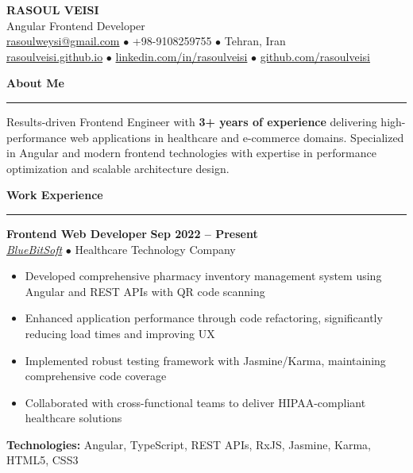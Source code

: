 \documentclass[a4paper,10pt]{article}
\newcommand{\sectionheader}[1]{\vspace{6pt}\textbf{\large\color{headercolor}#1}\vspace{1pt}\hrule\vspace{4pt}}
\newcommand{\jobtitle}[1]{\textbf{#1}}
\newcommand{\company}[1]{\textit{\color{headercolor}#1}}
\begin{document}
\begin{center}
    {\huge\bfseries\color{headercolor} RASOUL VEISI} \\
    \vspace{2pt}
    {\large Angular Frontend Developer} \\
    \vspace{3pt}
    \href{mailto:rasoulweysi@gmail.com}{rasoulweysi@gmail.com} $\bullet$ +98-9108259755 $\bullet$ Tehran, Iran \\
    \href{https://rasoulveisi.github.io}{rasoulveisi.github.io} $\bullet$ \href{http://linkedin.com/in/rasoulveisi}{linkedin.com/in/rasoulveisi} $\bullet$ \href{https://github.com/rasoulveisi}{github.com/rasoulveisi}
\end{center}

\vspace{4pt}

\sectionheader{About Me}
Results-driven Frontend Engineer with \textbf{3+ years of experience} delivering high-performance web applications in healthcare and e-commerce domains. Specialized in Angular and modern frontend technologies with expertise in performance optimization and scalable architecture design.

\sectionheader{Work Experience}

\jobtitle{Frontend Web Developer} \hfill \textbf{Sep 2022 -- Present} \\
\href{https://bluebitsoft.codes/}{\company{BlueBitSoft}} $\bullet$ Healthcare Technology Company \\
\vspace{-10pt}
\begin{itemize}[leftmargin=15pt, itemsep=2pt, parsep=0pt, topsep=3pt]
    \item Developed comprehensive pharmacy inventory management system using Angular and REST APIs with QR code scanning
    \item Enhanced application performance through code refactoring, significantly reducing load times and improving UX
    \item Implemented robust testing framework with Jasmine/Karma, maintaining comprehensive code coverage
    \item Collaborated with cross-functional teams to deliver HIPAA-compliant healthcare solutions
\end{itemize}
\vspace{-1pt}
\textbf{Technologies:} Angular, TypeScript, REST APIs, RxJS, Jasmine, Karma, HTML5, CSS3
\end{document}
